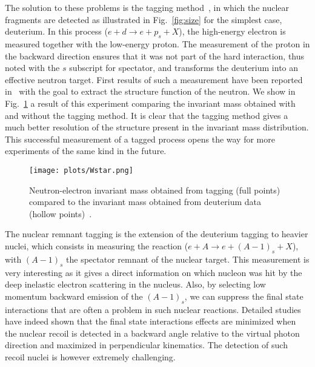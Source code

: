 The solution to these problems is the tagging method~\cite{CiofidegliAtti:1999kp}, in which the nuclear fragments
are detected as illustrated in Fig.~\ref{fig:size} for the simplest case, deuterium.
In this process ($e+d \rightarrow e+p_s+X$), the high-energy electron is measured
together with the low-energy proton. The measurement of the proton in the backward 
direction ensures that it was not part of the hard interaction, thus noted with 
the $s$ subscript for spectator, and transforms the deuterium into 
an effective neutron target. First results of such a measurement
have been reported in~\cite{Baillie:2011za} with the goal to extract the structure
function of the neutron. We show in Fig.~\ref{fig:wstar} a result of this experiment
comparing the invariant mass obtained with and without the tagging method. It is 
clear that the tagging method gives a much better resolution of the structure 
present in the invariant mass distribution. This successful measurement of a tagged process opens the way for more
experiments of the same kind in the future. 

\begin{figure}[tbp]
\centering\texttt{[image: plots/Wstar.png]}
\caption{Neutron-electron invariant mass obtained from tagging (full points) compared 
to the invariant mass obtained
from deuterium data (hollow points)~\cite{Baillie:2011za}.}
\label{fig:wstar}
\end{figure}

The nuclear remnant tagging is the extension of the deuterium tagging to heavier nuclei, which
consists in measuring the reaction ($e+A \rightarrow e+(A-1)_s+X$), with
$(A-1)_s$ the spectator remnant of the nuclear target. This measurement is very 
interesting as it gives a direct information on which nucleon was hit by the 
deep inelastic electron scattering in the nucleus. Also, by selecting 
low momentum backward emission of the $(A-1)_s$, we can suppress the 
final state interactions that are often a problem in such nuclear reactions. 
Detailed studies~\cite{CiofidegliAtti:2003pb,Alvioli:2006jd} have indeed shown 
that the final state interactions effects are minimized when the nuclear recoil
is detected in a backward angle relative to 
the virtual photon direction and maximized in perpendicular kinematics.
The detection of such recoil nuclei is however extremely challenging.

